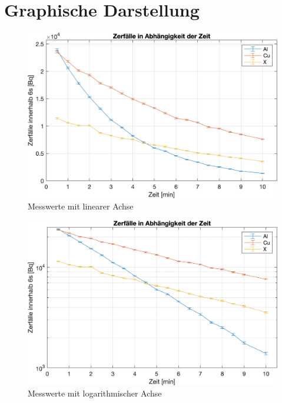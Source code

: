 \documentclass[12pt,german]{article}
\begin{document}
    \section{Graphische Darstellung}
    \begin{figure}[H]
        \centering
        \includegraphics[width=\textwidth]{linear.png}
        \caption{Messwerte mit linearer Achse}
    \end{figure}
    \begin{figure}[H]
        \centering
        \includegraphics[width=\textwidth]{logarithmic.png}
        \caption{Messwerte mit logarithmischer Achse}
    \end{figure}
\end{document}
